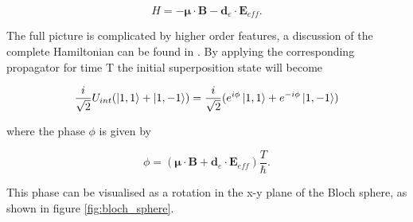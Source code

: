 \begin{equation} \label{main_interaction_hamiltonian}
    H = - \boldsymbol{\mu} \cdot \mathbf{B} - \mathbf{d}_e \cdot \mathbf{E}_{eff}.
\end{equation}

The full picture is complicated by higher order features, a discussion of the complete Hamiltonian can be found in \cite{Regan_2001, Regan_2002}. By applying the corresponding propagator for time T the initial superposition state will become

\begin{equation} \label{main_interaction_propagated_state}
    \frac{i}{\sqrt{2}} U_{int} (\ket{1,1} + \ket{1,-1}) = \frac{i}{\sqrt{2}} (e^{i \phi} \ket{1, 1} + e^{-i \phi} \ket{1, -1})
\end{equation}

where the phase $\phi$ is given by

\begin{equation} \label{main_interaction_propagated_phase}
    \phi = (\boldsymbol{\mu} \cdot \mathbf{B} + \mathbf{d}_e \cdot \mathbf{E}_{eff}) \frac{T}{\hbar}.
\end{equation}

This phase can be visualised as a rotation in the x-y plane of the Bloch sphere, as shown in figure \ref{fig:bloch_sphere}. 

